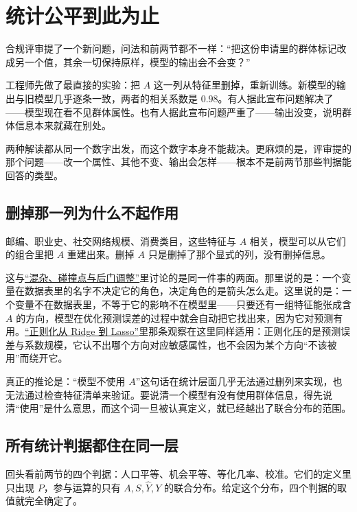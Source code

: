 \section{统计公平到此为止}
\label{sec:17-Constrained-Guarantees/03-Fairness-Impossibility/03}

合规评审提了一个新问题，问法和前两节都不一样：``把这份申请里的群体标记改成另一个值，其余一切保持原样，模型的输出会不会变？''

工程师先做了最直接的实验：把 \(A\) 这一列从特征里删掉，重新训练。新模型的输出与旧模型几乎逐条一致，两者的相关系数是 \(0.98\)。有人据此宣布问题解决了——模型现在看不见群体属性。也有人据此宣布问题严重了——输出没变，说明群体信息本来就藏在别处。

两种解读都从同一个数字出发，而这个数字本身不能裁决。更麻烦的是，评审提的那个问题——改一个属性、其他不变、输出会怎样——根本不是前两节那些判据能回答的类型。

\subsection{删掉那一列为什么不起作用}

邮编、职业史、社交网络规模、消费类目，这些特征与 \(A\) 相关，模型可以从它们的组合里把 \(A\) 重建出来。删掉 \(A\) 只是删掉了那个显式的列，没有删掉信息。

这与\hyperref[sec:13-Machine-Learning/12-Causal-Inference/03]{``混杂、碰撞点与后门调整''}里讨论的是同一件事的两面。那里说的是：一个变量在数据表里的名字不决定它的角色，决定角色的是箭头怎么走。这里说的是：一个变量不在数据表里，不等于它的影响不在模型里——只要还有一组特征能张成含 \(A\) 的方向，模型在优化预测误差的过程中就会自动把它找出来，因为它对预测有用。\hyperref[sec:13-Machine-Learning/02-Linear-Models/02]{``正则化从 Ridge 到 Lasso''}里那条观察在这里同样适用：正则化压的是预测误差与系数规模，它认不出哪个方向对应敏感属性，也不会因为某个方向``不该被用''而绕开它。

真正的推论是：``模型不使用 \(A\)''这句话在统计层面几乎无法通过删列来实现，也无法通过检查特征清单来验证。要说清一个模型有没有使用群体信息，得先说清``使用''是什么意思，而这个词一旦被认真定义，就已经越出了联合分布的范围。

\subsection{所有统计判据都住在同一层}

回头看前两节的四个判据：人口平等、机会平等、等化几率、校准。它们的定义里只出现 \(P\)，参与运算的只有 \(A,S,\hat Y,Y\) 的联合分布。给定这个分布，四个判据的取值就完全确定了。

